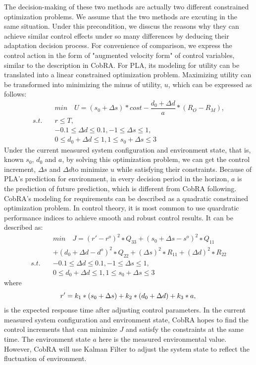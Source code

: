 \documentclass[sigconf]{acmart}
\begin{document}
The decision-making of these two methods are actually two different constrained optimization problems. We assume that the two methods are excuting in the same situation. Under this precondition, we disscus the reasons why they can achieve similar control effects under so many differences by deducing their adaptation decision process. For convenience of comparison, we express the control action in the form of "augmented velocity form" of control variables, similar to the description in CobRA. For PLA, its modeling for utility can be translated into a linear constrained optimization problem. Maximizing utility can be transformed into minimizing the minus of utility, $u$, which can be expressed as follows:
\begin{equation}
\begin{aligned}
&min\quad U=(s_0+\Delta s)*cost-\dfrac{d_0+\Delta d}{a}*(R_{O}-R_{M}), \\
s.t.\quad &r\leq T,\\
&-0.1\leq \Delta d\leq 0.1, -1\leq \Delta s\leq 1,\\
&0\leq d_0+\Delta d\leq 1,1\leq s_0+\Delta s\leq 3
\end{aligned}
\end{equation}
Under the current measured system configuration and environment state, that is, known $s_0$, $d_0$ and $a$, by solving this optimization problem, we can get the control increment, $\Delta s$ and $\Delta d$to minimize $u$ while satisfying their constraints. Because of PLA's prediction for environment, in every decision period in the horizon, $a$ is the prediction of future prediction, which is different from CobRA following.
CobRA's modeling for requirements can be described as a quadratic constrained optimization problem. In control theory, it is most common to use quardratic performance indices to achieve smooth and robust control results. It can be described as:
\begin{equation}
\begin{aligned}
&min\quad J=(r'-r^o)^2∗Q_{33}+(s_0+\Delta s-s^o )^2∗Q_{11}\\
&+(d_0+\Delta d-d^o)^2∗Q_{22}+(\Delta s)^{2}∗R_{11}+(\Delta d)^2∗R_{22}\\
s.t.\quad &-0.1\leq \Delta d\leq 0.1, -1\leq \Delta s\leq 1,\\
&0\leq d_0+\Delta d\leq 1,1\leq s_0+\Delta s\leq 3
\end{aligned}
\end{equation}
where
\begin{equation}
r'=k_1 *(s_0+\Delta s)+k_2 *(d_0+\Delta d)+k_3*a,\\
\end{equation}
is the expected response time after adjusting control parameters.
In the current measured system configuration and environment state, CobRA hopes to find the control increments that can minimize $J$ and satisfy the constraints at the same time. The environment state $a$ here is the measured environmental value. However, CobRA will use Kalman Filter to adjust the system state to reflect the fluctuation of environment.
\end{document}
